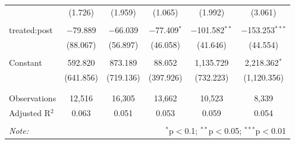\begin{table}[!htbp]
\begin{tabular}{@{\extracolsep{0pt}}lccccc}
  & (1.726) & (1.959) & (1.065) & (1.992) & (3.061) \\ 
  & & & & & \\ 
 treated:post & $-$79.889 & $-$66.039 & $-$77.409$^{*}$ & $-$101.582$^{**}$ & $-$153.253$^{***}$ \\ 
  & (88.067) & (56.897) & (46.058) & (41.646) & (44.554) \\ 
  & & & & & \\ 
 Constant & 592.820 & 873.189 & 88.052 & 1,135.729 & 2,218.362$^{*}$ \\ 
  & (641.856) & (719.136) & (397.926) & (732.223) & (1,120.356) \\ 
  & & & & & \\ 
\hline \\[-1.8ex] 
Observations & 12,516 & 16,305 & 13,662 & 10,523 & 8,339 \\ 
Adjusted R$^{2}$ & 0.063 & 0.051 & 0.053 & 0.059 & 0.054 \\ 
\hline 
\hline \\[-1.8ex] 
\textit{Note:}  & \multicolumn{5}{r}{$^{*}$p$<$0.1; $^{**}$p$<$0.05; $^{***}$p$<$0.01} \\ 
\end{tabular} 
\end{table} 
